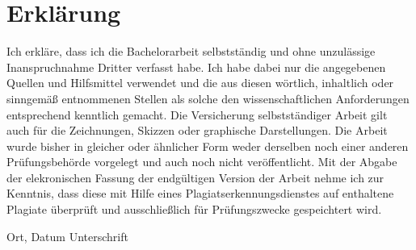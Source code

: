 \documentclass[twoside,12pt,a4paper]{report}
\begin{document}
\cleardoublepage


\chapter*{Erklärung}

\noindent
Ich erkläre, dass ich die Bachelorarbeit selbstständig und ohne unzulässige Inanspruchnahme Dritter verfasst habe. Ich habe dabei nur die angegebenen Quellen und Hilfsmittel verwendet und die aus diesen wörtlich, inhaltlich oder sinngemäß entnommenen Stellen als solche den wissenschaftlichen Anforderungen entsprechend kenntlich gemacht. Die Versicherung selbstständiger Arbeit gilt auch für die Zeichnungen, Skizzen oder graphische Darstellungen. Die Arbeit wurde bisher in gleicher oder ähnlicher Form weder derselben noch einer anderen Prüfungsbehörde vorgelegt und auch noch nicht veröffentlicht. Mit der Abgabe der elekronischen Fassung der endgültigen Version der Arbeit nehme ich zur Kenntnis, dass diese mit Hilfe eines Plagiatserkennungsdienstes auf enthaltene Plagiate überprüft und ausschließlich für Prüfungszwecke gespeichtert wird.

\vskip 2cm

Ort, Datum	\hfill Unterschrift \hfill 
\end{document}
